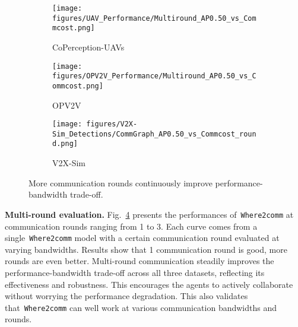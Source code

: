 \documentclass{article}
\begin{document}
\begin{figure}[!t]
  \centering
\begin{subfigure}{0.32\linewidth}
    \texttt{[image: figures/UAV\_Performance/Multiround\_AP0.50\_vs\_Commcost.png]}
    \vspace{-1mm}
    \caption{CoPerception-UAVs}
    \label{fig:UAV_MultiRound}
  \end{subfigure}
\begin{subfigure}{0.32\linewidth}
    \texttt{[image: figures/OPV2V\_Performance/Multiround\_AP0.50\_vs\_Commcost.png]}
    \vspace{-1mm}
    \caption{OPV2V}
    \label{fig:OPV2V_MultiRound}
  \end{subfigure}
\begin{subfigure}{0.32\linewidth}
    \texttt{[image: figures/V2X-Sim\_Detections/CommGraph\_AP0.50\_vs\_Commcost\_round.png]}
    \vspace{-1mm}
    \caption{V2X-Sim}
    \label{fig:V2X_MultiRound}
    \end{subfigure}
  \vspace{-2mm}
  \caption{More communication rounds continuously improve performance-bandwidth trade-off.}
  \label{fig:multiround}
  \vspace{-5mm}
\end{figure}



\textbf{Multi-round evaluation.} Fig.~\ref{fig:multiround} presents the performances of~\texttt{Where2comm} at communication rounds ranging from 1 to 3. Each curve comes from a single~\texttt{Where2comm} model with a certain communication round evaluated at varying bandwidths. Results show that 1 communication round is good, more rounds are even better. Multi-round communication steadily improves the performance-bandwidth trade-off across all three datasets, reflecting its effectiveness and robustness. This encourages the agents to actively collaborate without worrying the performance degradation. This also validates that~\texttt{Where2comm} can well work at various communication bandwidths and rounds.
\end{document}
